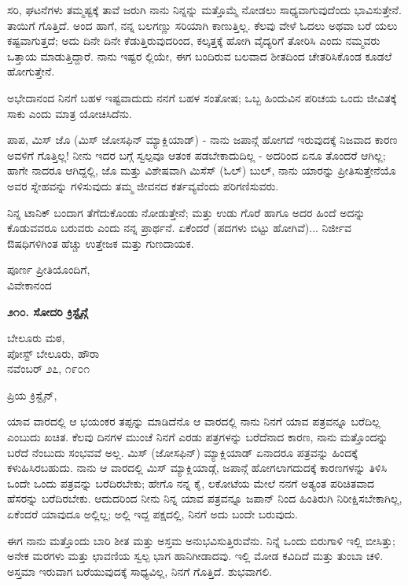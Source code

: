 ಸರಿ, ಘಟನೆಗಳು ತಮ್ಮಷ್ಟಕ್ಕೆ ತಾವೆ ಜರುಗಿ ನಾನು ನಿನ್ನನ್ನು ಮತ್ತೊಮ್ಮೆ ನೋಡಲು ಸಾಧ್ಯವಾಗುವುದೆಂದು ಭಾವಿಸುತ್ತೇನೆ. ತಾಯಿಗೆ ಗೊತ್ತಿದೆ. ಅಂದ ಹಾಗೆ, ನನ್ನ ಬಲಗಣ್ಣು ಸರಿಯಾಗಿ ಕಾಣುತ್ತಿಲ್ಲ. ಕೆಲವು ವೇಳೆ ಓದಲು ಅಥವಾ ಬರೆ ಯಲು ಕಷ್ಟವಾಗುತ್ತದೆ; ಅದು ದಿನೇ ದಿನೇ ಕೆಡುತ್ತಿರುವುದರಿಂದ, ಕಲ್ಕತ್ತಕ್ಕೆ ಹೋಗಿ ವೈದ್ಯರಿಗೆ ತೋರಿಸಿ ಎಂದು ನಮ್ಮವರು ಒತ್ತಾಯ ಮಾಡುತ್ತಿದ್ದಾರೆ. ನಾನು ಇಷ್ಟರ ಲ್ಲಿಯೇ, ಈಗ ಬಂದಿರುವ ಬಲವಾದ ಶೀತದಿಂದ ಚೇತರಿಸಿಕೊಂಡ ಕೂಡಲೆ ಹೋಗುತ್ತೇನೆ.

ಅಭೇದಾನಂದ ನಿನಗೆ ಬಹಳ ಇಷ್ಟವಾದುದು ನನಗೆ ಬಹಳ ಸಂತೋಷ; ಒಬ್ಬ ಹಿಂದುವಿನ ಪರಿಚಯ ಒಂದು ಜೀವಿತಕ್ಕೆ ಸಾಕು ಎಂದು ಮಾತ್ರ ಯೋಚಿಸಿದೆನು.

ಪಾಪ, ಮಿಸ್ ಜೊ (ಮಿಸ್ ಜೋಸಫಿನ್ ಮ್ಯಾಕ್ಲಿಯಾಡ್) - ನಾನು ಜಪಾನ್ಗೆ ಹೋಗದೆ ಇರುವುದಕ್ಕೆ ನಿಜವಾದ ಕಾರಣ ಅವಳಿಗೆ ಗೊತ್ತಿಲ್ಲ! ನೀನು ಇದರ ಬಗ್ಗೆ ಸ್ವಲ್ಪವೂ ಆತಂಕ ಪಡಬೇಕಾದುದಿಲ್ಲ - ಅದರಿಂದ ಏನೂ ತೊಂದರೆ ಆಗಿಲ್ಲ; ಹಾಗೇ ನಾದರೂ ಆಗಿದ್ದಲ್ಲಿ, ಜೊ ಮತ್ತು ವಿಶೇಷವಾಗಿ ಮಿಸೆಸ್ (ಓಲ್) ಬುಲ್, ನಾನು ಯಾರನ್ನು ಪ್ರೀತಿಸುತ್ತೇನೆಯೊ ಅವರ ಸ್ನೇಹವನ್ನು ಗಳಿಸುವುದು ತಮ್ಮ ಜೀವನದ ಕರ್ತವ್ಯವೆಂದು ಪರಿಗಣಿಸುವರು.

ನಿನ್ನ ಟಾನಿಕ್ ಬಂದಾಗ ತೆಗೆದುಕೊಂಡು ನೋಡುತ್ತೇನೆ; ಮತ್ತು ಉಡು ಗೊರೆ ಹಾಗೂ ಅದರ ಹಿಂದೆ ಅದನ್ನು ಕೊಡುವವರೂ ಬರುವರು ಎಂದು ನನ್ನ ಪ್ರಾರ್ಥನೆ. ಏಕೆಂದರೆ (ಪದಗಳು ಬಿಟ್ಟು ಹೋಗಿವೆ)... ನಿರ್ಜೀವ ಔಷಧಿಗಳಿಗಿಂತ ಹೆಚ್ಚು ಉತ್ತೇಜಕ ಮತ್ತು ಗುಣದಾಯಕ.

\begin{flushright}
ಪೂರ್ಣ ಪ್ರೀತಿಯೊಂದಿಗೆ,\\ವಿವೇಕಾನಂದ
\end{flushright}

\begin{center}
\textbf{೨೧೦. ಸೋದರಿ ಕ್ರಿಸ್ಟೈನ್ಗೆ}
\end{center}

\begin{flushright}
ಬೇಲೂರು ಮಠ,\\ಪೋಸ್ಟ್ ಬೇಲೂರು, ಹೌರಾ\\ನವೆಂಬರ್ ೨೭, ೧೯೦೧
\end{flushright}

ಪ್ರಿಯ ಕ್ರಿಸ್ಟೈನ್,

ಯಾವ ವಾರದಲ್ಲಿ ಆ ಭಯಂಕರ ತಪ್ಪನ್ನು ಮಾಡಿದೆನೊ ಆ ವಾರದಲ್ಲಿ ನಾನು ನಿನಗೆ ಯಾವ ಪತ್ರವನ್ನೂ ಬರೆದಿಲ್ಲ ಎಂಬುದು ಖಚಿತ. ಕೆಲವು ದಿನಗಳ ಮುಂಚೆ ನಿನಗೆ ಎರಡು ಪತ್ರಗಳನ್ನು ಬರೆದೆನಾದ ಕಾರಣ, ನಾನು ಮತ್ತೊಂದನ್ನು ಬರೆದೆ ನೆಂಬುದು ಸಂಭವವೆ ಅಲ್ಲ. ಮಿಸ್ (ಜೋಸಫಿನ್) ಮ್ಯಾಕ್ಲಿಯಾಡ್ ಏನಾದರೂ ಪತ್ರವನ್ನು ಹಿಂದಕ್ಕೆ ಕಳುಹಿಸಿರಬಹುದು. ನಾನು ಆ ವಾರದಲ್ಲಿ ಮಿಸ್ ಮ್ಯಾಕ್ಲಿಯಾಡ್ಗೆ, ಜಪಾನ್ಗೆ ಹೋಗಲಾಗದುದಕ್ಕೆ ಕಾರಣಗಳನ್ನು ತಿಳಿಸಿ ಒಂದೇ ಒಂದು ಪತ್ರವನ್ನು ಬರೆದಿರಬೇಕು; ಹೇಗೊ ನನ್ನ ಕೈ, ಲಕೋಟೆಯ ಮೇಲೆ ನನಗೆ ಅತ್ಯಂತ ಪರಿಚಿತವಾದ ಹೆಸರನ್ನು ಬರೆದಿರಬೇಕು. ಆದುದರಿಂದ ನೀನು ನಿನ್ನ ಯಾವ ಪತ್ರವನ್ನೂ ಜಪಾನ್ ನಿಂದ ಹಿಂತಿರುಗಿ ನಿರೀಕ್ಷಿಸಬೇಕಾಗಿಲ್ಲ, ಏಕೆಂದರೆ ಯಾವುದೂ ಅಲ್ಲಿಲ್ಲ; ಅಲ್ಲಿ ಇದ್ದ ಪಕ್ಷದಲ್ಲಿ, ನಿನಗೆ ಅದು ಬಂದೇ ಬರುವುದು.

ಈಗ ನಾನು ಮತ್ತೊಂದು ಬಾರಿ ಶೀತ ಮತ್ತು ಅಸ್ತಮ ಅನುಭವಿಸುತ್ತಿರುವೆನು. ನಿನ್ನೆ ಒಂದು ಬಿರುಗಾಳಿ ಇಲ್ಲಿ ಬೀಸಿತ್ತು; ಅನೇಕ ಮರಗಳು ಮತ್ತು ಛಾವಣಿಯ ಸ್ವಲ್ಪ ಭಾಗ ಹಾನಿಗೀಡಾದವು. ಇಲ್ಲಿ ಮೋಡ ಕವಿದಿದೆ ಮತ್ತು ತುಂಬಾ ಚಳಿ. ಅಸ್ತಮಾ ಇರುವಾಗ ಬರೆಯುವುದಕ್ಕೆ ಸಾಧ್ಯವಿಲ್ಲ, ನಿನಗೆ ಗೊತ್ತಿದೆ. ಶುಭವಾಗಲಿ.


